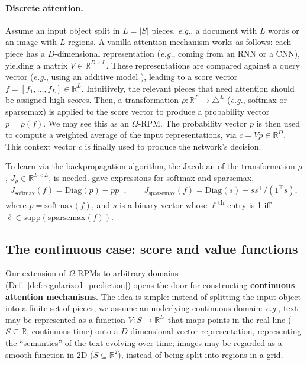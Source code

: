 \documentclass{article}
\begin{document}
\paragraph{Discrete attention.}
Assume an input object split in $L=|S|$ pieces, \textit{e.g.}, a document with $L$ words or an image with $L$ regions. 
A vanilla attention mechanism works as follows: each piece has a $D$-dimensional representation (\textit{e.g.}, coming from an RNN or a CNN), yielding a matrix $V \in \mathbb{R}^{D\times L}$. These representations are compared against a query vector (\textit{e.g.}, using an additive model \citep{bahdanau2014neural}), leading to a score vector $f = [f_1, \ldots, f_L] \in \mathbb{R}^L$. 
Intuitively, the relevant pieces that need attention should be assigned high scores. Then, a transformation $\rho : \mathbb{R}^L \rightarrow \triangle^{L}$ (\textit{e.g.}, softmax or sparsemax) is applied to the score vector to produce a probability vector $p = \rho(f)$.
We may see this as an $\Omega$-RPM. The probability vector $p$ is then used to compute a weighted average of the input representations, via $c = Vp \in \mathbb{R}^D$. This context vector $c$ is finally used to produce the network's decision.

To learn via the backpropagation algorithm, the Jacobian of the transformation $\rho$, $J_{\rho} \in \mathbb{R}^{L \times L}$, is needed. 
\citet{Martins2016ICML} gave  expressions for softmax and sparsemax,
\begin{equation}\label{eq:jacobians_discrete}
J_{\mathrm{softmax}}(f) = \mathrm{Diag}(p) - pp^\top, \qquad
J_{\mathrm{sparsemax}}(f) = \mathrm{Diag}(s) - ss^\top/(1^\top s),
\end{equation}
where $p=\mathrm{softmax}(f)$, and $s$ is a binary vector whose $\ell$\textsuperscript{th} entry is 1 iff $\ell \in \mathrm{supp}(\mathrm{sparsemax}(f))$. 

\subsection{The continuous case: score and value functions}
\label{subsec:continuous_attention}

Our extension of $\Omega$-RPMs to arbitrary domains (Def.~\ref{def:regularized_prediction}) opens the door for constructing {\bf continuous attention mechanisms}. The idea is simple: instead of splitting the input object into a finite set of pieces, we assume an underlying continuous domain: \textit{e.g.}, text may be represented as a function $V:S \rightarrow \mathbb{R}^{D}$ that maps points in the real line ($S \subseteq \mathbb{R}$, continuous time) onto a $D$-dimensional vector representation, representing the ``semantics'' of the text evolving over time; images may be regarded as a smooth function in 2D ($S \subseteq \mathbb{R}^2$), instead of being split into regions in a grid. 
\end{document}
